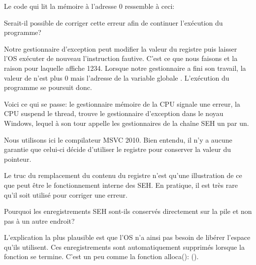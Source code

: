 Le code qui lit la mémoire à l'adresse 0 ressemble à ceci:



Serait-il possible de corriger cette erreur  afin de continuer l'exécution du programme?

Notre gestionnaire d'exception peut modifier la valeur du registre \EAX puis laisser l'\ac{OS} 
exécuter de nouveau l'instruction fautive.
C'est ce que nous faisons et la raison pour laquelle \printf affiche 1234. Lorsque notre gestionnaire 
a fini son travail, la valeur de \EAX n'est plus 0 mais l'adresse de la variable globale .
L'exécution du programme se poursuit donc.

Voici ce qui se passe: le gestionnaire mémoire de la \ac{CPU} signale une erreur, la \ac{CPU} suspend 
le thread, trouve le gestionnaire d'exception dans le noyau Windows, lequel à son tour appelle les 
gestionnaires de la chaîne \ac{SEH} un par un.

Nous utilisons ici le compilateur MSVC 2010. Bien entendu, il n'y a aucune garantie que celui-ci 
décide d'utiliser le registre \EAX pour conserver la valeur du pointeur.

Le truc du remplacement du contenu du registre n'est qu'une illustration de ce que peut être le 
fonctionnement interne des \ac{SEH}.
En pratique, il est très rare qu'il soit utilisé pour corriger  une erreur.

Pourquoi les enregistrements SEH sont-ils conservés directement sur la pile et non pas à un autre 
endroit?

L'explication la plus plausible est que l'\ac{OS} n'a ainsi pas besoin de libérer l'espace qu'ils 
utilisent. Ces enregistrements sont automatiquement supprimés lorsque la fonction se termine.
C'est un peu comme la fonction alloca(): ().

